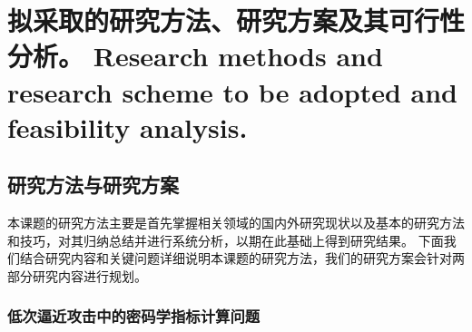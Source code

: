 \documentclass[a4paper,zihao=-4,AutoFakeBold]{ctexart}
\begin{document}
\section{拟采取的研究方法、研究方案及其可行性分析。
  Research methods and research scheme to be adopted
  and feasibility analysis.}

\subsection{研究方法与研究方案}
本课题的研究方法主要是首先掌握相关领域的国内外研究现状以及基本的研究方法和技巧，对其归纳总结并进行系统分析，以期在此基础上得到研究结果。
下面我们结合研究内容和关键问题详细说明本课题的研究方法，我们的研究方案会针对两部分研究内容进行规划。
\subsubsection{低次逼近攻击中的密码学指标计算问题}
\end{document}
